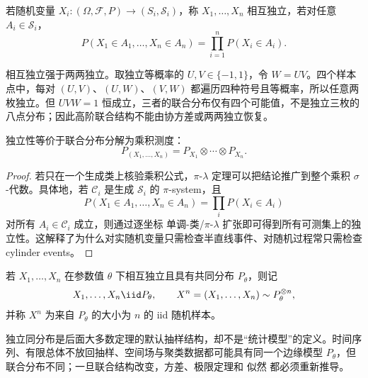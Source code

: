 \begin{definition}[相互独立]
若随机变量 $X_i:(\Omega,\mathcal F,P)\to(S_i,\mathcal S_i)$，称 $X_1,\ldots,X_n$ 相互独立，若对任意 $A_i\in\mathcal S_i$，
\begin{equation*}P(X_1\in A_1,\ldots,X_n\in A_n)
=\prod_{i=1}^nP(X_i\in A_i).\end{equation*}
\end{definition}
\begin{workedexample}[两两独立仍不能代替相互独立]
相互独立强于两两独立。取独立等概率的 $U,V\in\{-1,1\}$，令 $W=UV$。四个样本点中，每对 $(U,V)$、$(U,W)$、$(V,W)$ 都遍历四种符号且等概率，所以任意两枚独立。但 $UVW=1$ 恒成立，三者的联合分布仅有四个可能值，不是独立三枚的八点分布；因此高阶联合结构不能由协方差或两两独立恢复。

\end{workedexample}
\begin{proposition}[独立性的乘积测度判据]
独立性等价于联合分布分解为乘积测度：
\begin{equation*}P_{(X_1,\ldots,X_n)}
=P_{X_1}\otimes\cdots\otimes P_{X_n}.\end{equation*}
\end{proposition}
\begin{proof}
若只在一个生成类上核验乘积公式，$\pi$-$\lambda$ 定理可以把结论推广到整个乘积 $\sigma$-代数。具体地，若 $\mathcal C_i$ 是生成 $\mathcal S_i$ 的 $\pi$-system，且
\[
P(X_1\in A_1,\ldots,X_n\in A_n)
=\prod_iP(X_i\in A_i)
\]
对所有 $A_i\in\mathcal C_i$ 成立，则通过逐坐标 单调-类/$\pi$-$\lambda$ 扩张即可得到所有可测集上的独立性。这解释了为什么对实随机变量只需检查半直线事件、对随机过程常只需检查 cylinder events。

\end{proof}

\begin{definition}[随机样本]
若 $X_1,\ldots,X_n$ 在参数值 $\theta$ 下相互独立且具有共同分布 $P_\theta$，则记
\begin{equation}\label{eq:math-stat-iid-sample}
 X_1,\ldots,X_n\iid P_\theta,
 \qquad
 X^n=(X_1,\ldots,X_n)\sim P_\theta^{\otimes n},
\end{equation}
并称 $X^n$ 为来自 $P_\theta$ 的大小为 $n$ 的 iid 随机样本。
\end{definition}

独立同分布是后面大多数定理的默认抽样结构，却不是“统计模型”的定义。时间序列、有限总体不放回抽样、空间场与聚类数据都可能具有同一个边缘模型 $P_\theta$，但联合分布不同；一旦联合结构改变，方差、极限定理和 似然 都必须重新推导。


